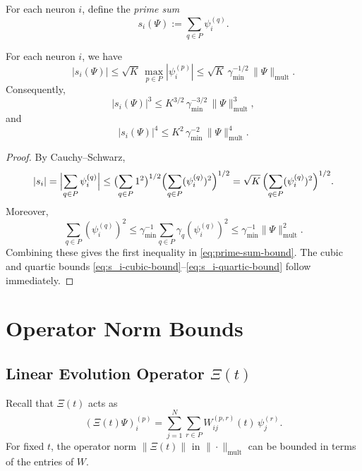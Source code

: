 \documentclass[11pt]{article}
\begin{document}
For each neuron \(i\), define the \emph{prime sum}
\begin{equation}
\label{eq:s_i-def}
s_i(\Psi) := \sum_{q\in P} \psi_i^{(q)}.
\end{equation}

\begin{lemma}
\label{lem:prime-sum-bounds}
For each neuron \(i\), we have
\begin{equation}
\label{eq:prime-sum-bound}
|s_i(\Psi)|
\le \sqrt{K}\,\max_{p\in P} |\psi_i^{(p)}|
\le \sqrt{K}\,\gamma_{\min}^{-1/2}\,\|\Psi\|_{\mathrm{mult}}.
\end{equation}
Consequently,
\begin{equation}
\label{eq:s_i-cubic-bound}
|s_i(\Psi)|^3
\le K^{3/2}\,\gamma_{\min}^{-3/2}\,\|\Psi\|_{\mathrm{mult}}^3,
\end{equation}
and
\begin{equation}
\label{eq:s_i-quartic-bound}
|s_i(\Psi)|^4
\le K^2\,\gamma_{\min}^{-2}\,\|\Psi\|_{\mathrm{mult}}^4.
\end{equation}
\end{lemma}

\begin{proof}
By Cauchy–Schwarz,
\[
|s_i| = \Bigl|\sum_{q\in P} \psi_i^{(q)}\Bigr|
\le \bigl(\sum_{q\in P} 1^2\bigr)^{1/2}
     \Bigl(\sum_{q\in P} (\psi_i^{(q)})^2\Bigr)^{1/2}
= \sqrt{K}\,\Bigl(\sum_{q\in P} (\psi_i^{(q)})^2\Bigr)^{1/2}.
\]
Moreover,
\[
\sum_{q\in P} (\psi_i^{(q)})^2
\le \gamma_{\min}^{-1} \sum_{q\in P} \gamma_q (\psi_i^{(q)})^2
\le \gamma_{\min}^{-1} \|\Psi\|_{\mathrm{mult}}^2.
\]
Combining these gives the first inequality in \eqref{eq:prime-sum-bound}.
The cubic and quartic bounds \eqref{eq:s_i-cubic-bound}–\eqref{eq:s_i-quartic-bound} follow immediately.
\end{proof}

\section{Operator Norm Bounds}

\subsection{Linear Evolution Operator \(\Xi(t)\)}

Recall that \(\Xi(t)\) acts as
\[
(\Xi(t)\Psi)_i^{(p)} = \sum_{j=1}^N \sum_{r\in P} W_{ij}^{(p,r)}(t)\,\psi_j^{(r)}.
\]
For fixed \(t\), the operator norm \(\|\Xi(t)\|\) in \(\|\cdot\|_{\mathrm{mult}}\) can be bounded in terms of the entries of \(W\).
\end{document}
